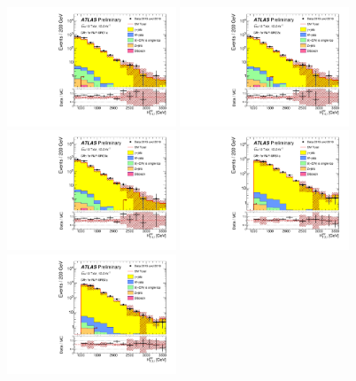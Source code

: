 \begin{figure}[tbp]
\begin{center}
\includegraphics[width=0.45\textwidth]{figures/ATLAS-CONF-2016-078_INT/N-1Plots/AtlasStyle/Preliminary/CRY_SRJigsawSRG1a_LastCut_CRY_minusone}
\includegraphics[width=0.45\textwidth]{figures/ATLAS-CONF-2016-078_INT/N-1Plots/AtlasStyle/Preliminary/CRY_SRJigsawSRG2a_LastCut_CRY_minusone}
\includegraphics[width=0.45\textwidth]{figures/ATLAS-CONF-2016-078_INT/N-1Plots/AtlasStyle/Preliminary/CRY_SRJigsawSRG3a_LastCut_CRY_minusone}
\includegraphics[width=0.45\textwidth]{figures/ATLAS-CONF-2016-078_INT/N-1Plots/AtlasStyle/Preliminary/CRY_SRJigsawSRS1a_LastCut_CRY_minusone}
\includegraphics[width=0.45\textwidth]{figures/ATLAS-CONF-2016-078_INT/N-1Plots/AtlasStyle/Preliminary/CRY_SRJigsawSRS2a_LastCut_CRY_minusone}

\end{center}
\end{figure}
